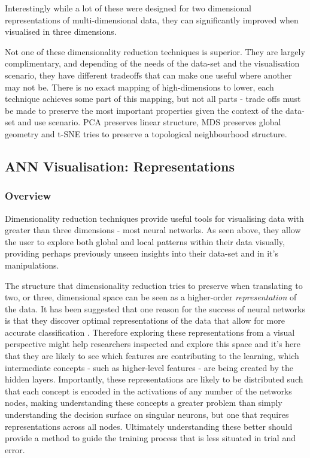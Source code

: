 \documentclass[a4paper,11pt,titlepage]{article}
\begin{document}
		\par 
		Interestingly while a lot of these were designed for two dimensional representations of multi-dimensional data, they can significantly improved when visualised in three dimensions.
		\par 
		Not one of these dimensionality reduction techniques is superior. They are largely complimentary, and depending of the needs of the data-set and the visualisation scenario, they have different tradeoffs that can make one useful where another may not be. There is no exact mapping of high-dimensions to lower, each technique achieves some part of this mapping, but not all parts - trade offs must be made to preserve the most important properties given the context of the data-set and use scenario. PCA preserves linear structure, MDS preserves global geometry and t-SNE tries to preserve a topological neighbourhood structure. 
		\par 
	
	\subsection{ANN Visualisation: Representations}
		
		\subsubsection{Overview}
		Dimensionality reduction techniques provide useful tools for visualising data with greater than three dimensions - most neural networks. As seen above, they allow the user to explore both global and local patterns within their data visually, providing perhaps previously unseen insights into their data-set and in it's manipulations. 
		\par 	
		The structure that dimensionality reduction tries to preserve when translating to two, or three, dimensional space can be seen as a higher-order \textit{representation} of the data. It has been suggested that one reason for the success of neural networks is that they discover optimal representations of the data that allow for more accurate classification \cite{Hinton1986}. Therefore exploring these representations from a visual perspective might help researchers inspected and explore this space and it's here that they are likely to see which features are contributing to the learning, which intermediate concepts - such as higher-level features - are being created by the hidden layers. Importantly, these representations are likely to be distributed \cite{Hinton1986} such that each concept is encoded in the activations of any number of the networks nodes, making understanding these concepts a greater problem than simply understanding the decision surface on singular neurons, but one that requires representations across all nodes. Ultimately understanding these better should provide a method to guide the training process that is less situated in trial and error.
		\par 
		
\end{document}
